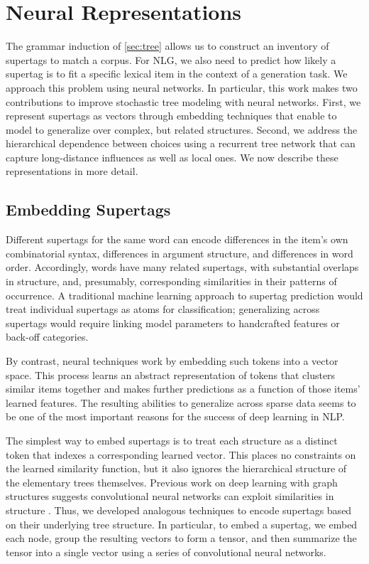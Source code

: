 \documentclass[11pt]{article}
\begin{document}
\section{Neural Representations}
\label{sec:neural}

The grammar induction of \ref{sec:tree} allows us to construct an
inventory of supertags to match a corpus.  For NLG, we also need to
predict how likely a supertag is to fit a specific lexical item in the
context of a generation task.  We approach this problem using neural
networks. 
%
In particular, this work makes two contributions to improve stochastic
tree modeling with neural networks.
%
First, we represent supertags as vectors through embedding techniques
that enable to model to generalize over complex, but related
structures.
%
Second, we address the hierarchical dependence between choices using a
recurrent tree network that can capture long-distance influences as
well as local ones.
%
We now describe these representations in more detail.

\subsection{Embedding Supertags}

Different supertags for the same word can encode differences in the
item's own combinatorial syntax, differences in argument structure, and
differences in word order.  Accordingly, words have many related
supertags, with substantial overlaps in structure, and, presumably,
corresponding similarities in their patterns of occurrence.  A
traditional machine learning approach to supertag prediction would
treat individual supertags as atoms for classification; generalizing
across supertags would require linking model parameters to handcrafted
features or back-off categories.

By contrast, neural techniques work by embedding such tokens into a
vector space. This process learns an abstract representation of tokens
that clusters similar items together and makes further predictions
as a function of those items' learned features.  The resulting
abilities to generalize across sparse data seems to be one of the most
important reasons for the success of deep learning in NLP.

The simplest way to embed supertags is to treat each structure
as a distinct token that indexes a corresponding learned vector.  This
places no constraints on the learned similarity function, but it also
ignores the hierarchical structure of the elementary trees
themselves.  Previous work on deep learning with graph structures
suggests convolutional neural networks can exploit similarities in structure \cite{niepert2016learning,kalchbrenner2014convolutional}.  Thus, we developed
analogous techniques to encode supertags based on their underlying
tree structure.  In particular, to embed a supertag, we embed each
node, group the resulting vectors to form a tensor, and then summarize
the tensor into a single vector using a series of convolutional neural
networks.
\end{document}
